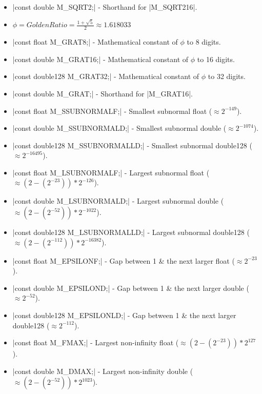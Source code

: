 \documentclass[12pt, letterpaper, oneside]{article}
\begin{document}
\begin{itemize}
		\item[--] \spverb|const double M_SQRT2;| - Shorthand for \spverb|M_SQRT216|.
		\newline
		\item[--] $\phi = Golden Ratio = \frac{1 + \sqrt{5}}{2} \approx 1.618033$
		\item[--] \spverb|const float M_GRAT8;| - Mathematical constant of $\phi$ to 8 digits.
		\item[--] \spverb|const double M_GRAT16;| - Mathematical constant of $\phi$ to 16 digits.
		\item[--] \spverb|const double128 M_GRAT32;| - Mathematical constant of $\phi$ to 32 digits.
		\item[--] \spverb|const double M_GRAT;| - Shorthand for \spverb|M_GRAT16|.
		\newline
		\item[--] \spverb|const float M_SSUBNORMALF;| - Smallest subnormal float ($\approx {2}^{-149}$).
		\item[--] \spverb|const double M_SSUBNORMALD;| - Smallest subnormal double ($\approx {2}^{-1074}$).
		\item[--] \spverb|const double128 M_SSUBNORMALLD;| - Smallest subnormal double128 ($\approx {2}^{-16495}$).
		\newline
		\item[--] \spverb|const float M_LSUBNORMALF;| - Largest subnormal float ($\approx (2-(2^{-23}))*2^{-126}$).
		\item[--] \spverb|const double M_LSUBNORMALD;| - Largest subnormal double ($\approx (2-(2^{-52}))*2^{-1022}$).
		\item[--] \spverb|const double128 M_LSUBNORMALLD;| - Largest subnormal double128 
		($\approx (2-(2^{-112}))*2^{-16382}$).
		\newline
		\item[--] \spverb|const float M_EPSILONF;| - Gap between 1 \& the next larger float ($\approx 2^{-23}$).
		\item[--] \spverb|const double M_EPSILOND;| - Gap between 1 \& the next larger double ($\approx 2^{-52}$).
		\item[--] \spverb|const double128 M_EPSILONLD;| - Gap between 1 \& the next larger double128 ($\approx
		2^{-112}$).
		\newline
		\item[--] \spverb|const float M_FMAX;| - Largest non-infinity float ($\approx (2-(2^{-23}))*2^{127}$).
		\item[--] \spverb|const double M_DMAX;| - Largest non-infinity double ($\approx (2-(2^{-52}))*2^{1023}$).

\end{itemize}
\end{document}
